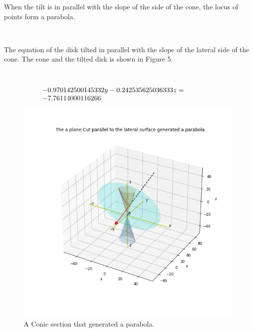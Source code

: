 \documentclass[10pt,a4paper,leqno]{article}
\begin{document}
\begin{CJK*}{UTF8}{gbsn}
\noindent When the tilt is in parallel with the slope of the side of the cone, the    locus of points form a parabola.
 \par \ \par\noindent The equation of the disk tilted in parallel with the slope of the lateral side of the cone. The cone and the tilted disk is shown in Figure 5.
 \par \ \par\begin{equation}
 \begin{minipage}{250pt}
                \begin{flushleft} $\displaystyle - 0.970142500145332 y - 0.242535625036333 z = -7.76114000116266$  \end{flushleft}
 \end{minipage}
 \end{equation}
\begin{figure}[H]
\centering\includegraphics[width=1\linewidth,height=0.7\textheight]{Data/fgr05.png}
\caption{A Conic section that generated a parabola. }
\label{fig:Data/fgr05.png}
\end{figure}


\end{CJK*}
\end{document}

